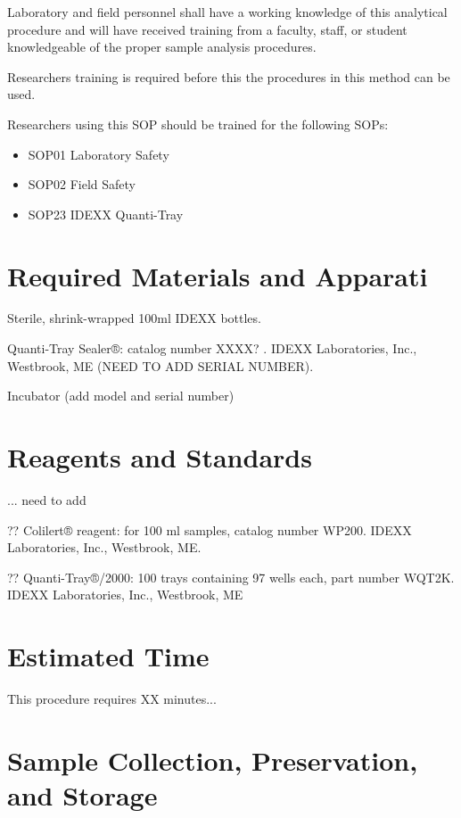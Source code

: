 \documentclass[12pt]{../SOP4_alpha}\usepackage[]{graphicx}\usepackage[]{color}
\begin{document}
\NP Laboratory and field personnel shall have a working knowledge of this analytical procedure and will have received training from a faculty, staff, or student knowledgeable of the proper sample analysis procedures. 

\NP Researchers training is required before this the procedures in this method can be used.

\NP Researchers using this SOP should be trained for the following SOPs:

\begin{itemize}
  \item SOP01 Laboratory Safety
  \item SOP02 Field Safety
  \item SOP23 IDEXX Quanti-Tray
\end{itemize}

\section{Required Materials and Apparati}

 Sterile, shrink-wrapped 100ml IDEXX bottles.

\NP Quanti-Tray Sealer®: catalog number XXXX? . IDEXX Laboratories, Inc., Westbrook, ME (NEED TO ADD SERIAL NUMBER).

\NP Incubator (add model and serial number) 


\section{Reagents and Standards}

\NP... need to add

?? Colilert® reagent: for 100 ml samples, catalog number WP200. IDEXX Laboratories, Inc., Westbrook, ME.

\NP ?? Quanti-Tray®/2000: 100 trays containing 97 wells each, part number WQT2K. IDEXX Laboratories, Inc., Westbrook, ME

\section{Estimated Time}

\NP This procedure requires XX minutes...

\section{Sample Collection, Preservation, and Storage}
\end{document}
